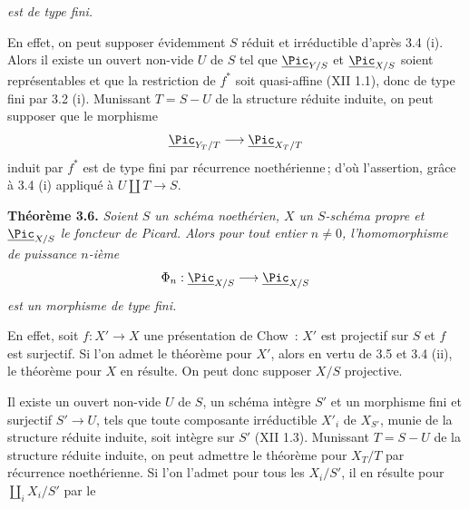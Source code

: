 \emph{est de type fini.}

En effet, on peut supposer \'evidemment \(S\) r\'eduit et irr\'eductible d'apr\`es 3.4 (i). Alors il existe un ouvert non-vide \(U\) de \(S\) tel que \(\underline{\Pic}_{Y/S}\) et \(\underline{\Pic}_{X/S}\) soient repr\'esentables et que la restriction de \(f^*\) soit quasi-affine (XII 1.1), donc de type fini par 3.2 (i). Munissant \(T=S-U\) de la structure r\'eduite induite, on peut supposer que le morphisme
\[
\underline{\Pic}_{Y_T/T}\longrightarrow\underline{\Pic}_{X_T/T}
\]
induit par \(f^*\) est de type fini par r\'ecurrence noeth\'erienne\,; d'o\`u l'assertion, gr\^ace \`a 3.4 (i) appliqu\'e \`a \(U\amalg T\to S\).

\textbf{Th\'eor\`eme 3.6.} \emph{Soient \(S\) un sch\'ema noeth\'erien, \(X\) un \(S\)-sch\'ema propre et \(\underline{\Pic}_{X/S}\) le foncteur de Picard. Alors pour tout entier \(n\ne0\), l'homomorphisme de puissance \(n\)-i\`eme}
\[
\Phi_n:\underline{\Pic}_{X/S}\longrightarrow\underline{\Pic}_{X/S}
\]
\emph{est un morphisme de type fini.}

En effet, soit \(f:X'\to X\) une pr\'esentation de Chow~: \(X'\) est projectif sur \(S\) et \(f\) est surjectif. Si l'on admet le th\'eor\`eme pour \(X'\), alors en vertu de 3.5 et 3.4 (ii), le th\'eor\`eme pour \(X\) en r\'esulte. On peut donc supposer \(X/S\) projective.

Il existe un ouvert non-vide \(U\) de \(S\), un sch\'ema int\`egre \(S'\) et un morphisme fini et surjectif \(S'\to U\), tels que toute composante irr\'eductible \(X'_i\) de \(X_{S'}\), munie de la structure r\'eduite induite, soit int\`egre sur \(S'\) (XII 1.3). Munissant \(T=S-U\) de la structure r\'eduite induite, on peut admettre le th\'eor\`eme pour \(X_T/T\) par r\'ecurrence noeth\'erienne. Si l'on l'admet pour tous les \(X_i/S'\), il en r\'esulte pour \(\coprod_iX_i/S'\) par le
